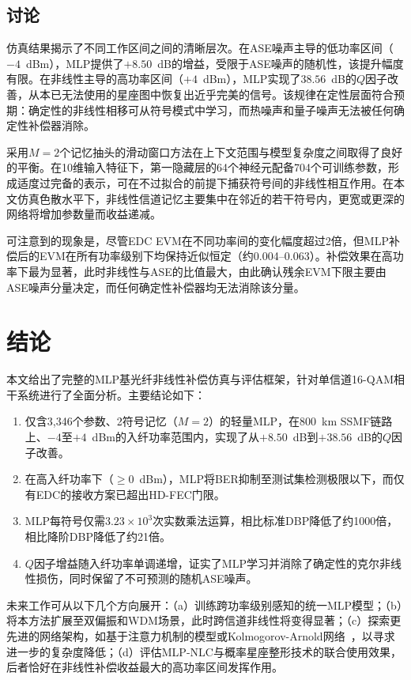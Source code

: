 \documentclass[conference]{IEEEtran}
\begin{document}
\subsection{讨论}

仿真结果揭示了不同工作区间之间的清晰层次。在ASE噪声主导的低功率区间（$-4$~dBm），MLP提供了$+8.50$~dB的增益，受限于ASE噪声的随机性，该提升幅度有限。在非线性主导的高功率区间（$+4$~dBm），MLP实现了$38.56$~dB的$Q$因子改善，从本已无法使用的星座图中恢复出近乎完美的信号。该规律在定性层面符合预期：确定性的非线性相移可从符号模式中学习，而热噪声和量子噪声无法被任何确定性补偿器消除。

采用$M = 2$个记忆抽头的滑动窗口方法在上下文范围与模型复杂度之间取得了良好的平衡。在10维输入特征下，第一隐藏层的64个神经元配备704个可训练参数，形成适度过完备的表示，可在不过拟合的前提下捕获符号间的非线性相互作用。在本文仿真色散水平下，非线性信道记忆主要集中在邻近的若干符号内，更宽或更深的网络将增加参数量而收益递减。

可注意到的现象是，尽管EDC EVM在不同功率间的变化幅度超过2倍，但MLP补偿后的EVM在所有功率级别下均保持近似恒定（约0.004--0.063）。补偿效果在高功率下最为显著，此时非线性与ASE的比值最大，由此确认残余EVM下限主要由ASE噪声分量决定，而任何确定性补偿器均无法消除该分量。

\section{结论}
\label{sec:conclusion}

本文给出了完整的MLP基光纤非线性补偿仿真与评估框架，针对单信道16-QAM相干系统进行了全面分析。主要结论如下：

\begin{enumerate}
    \item 仅含3,346个参数、2符号记忆（$M = 2$）的轻量MLP，在800~km SSMF链路上、$-4$至$+4$~dBm的入纤功率范围内，实现了从$+8.50$~dB到$+38.56$~dB的$Q$因子改善。
    \item 在高入纤功率下（$\ge 0$~dBm），MLP将BER抑制至测试集检测极限以下，而仅有EDC的接收方案已超出HD-FEC门限。
    \item MLP每符号仅需$3.23 \times 10^3$次实数乘法运算，相比标准DBP降低了约1000倍，相比降阶DBP降低了约21倍。
    \item $Q$因子增益随入纤功率单调递增，证实了MLP学习并消除了确定性的克尔非线性损伤，同时保留了不可预测的随机ASE噪声。
\end{enumerate}

未来工作可从以下几个方向展开：（a）训练跨功率级别感知的统一MLP模型；（b）将本方法扩展至双偏振和WDM场景，此时跨信道非线性将变得显著；（c）探索更先进的网络架构，如基于注意力机制的模型或Kolmogorov-Arnold网络~\cite{gdpkan2025}，以寻求进一步的复杂度降低；（d）评估MLP-NLC与概率星座整形技术的联合使用效果，后者恰好在非线性补偿收益最大的高功率区间发挥作用。
\end{document}
